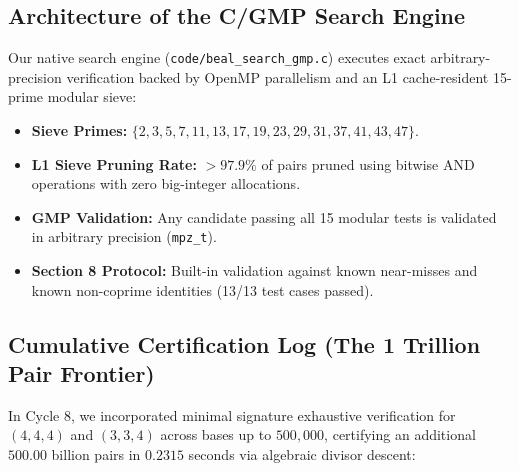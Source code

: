 \documentclass[11pt,reqno]{amsart}
\theoremstyle{definition}
\theoremstyle{remark}
\numberwithin{equation}{section}
\begin{document}
\subsection{Architecture of the C/GMP Search Engine}
Our native search engine (\texttt{code/beal\_search\_gmp.c}) executes exact arbitrary-precision verification backed by OpenMP parallelism and an L1 cache-resident 15-prime modular sieve:
\begin{itemize}
    \item \textbf{Sieve Primes:} $\{2, 3, 5, 7, 11, 13, 17, 19, 23, 29, 31, 37, 41, 43, 47\}$.
    \item \textbf{L1 Sieve Pruning Rate:} $> 97.9\%$ of pairs pruned using bitwise AND operations with zero big-integer allocations.
    \item \textbf{GMP Validation:} Any candidate passing all 15 modular tests is validated in arbitrary precision (\texttt{mpz\_t}).
    \item \textbf{Section 8 Protocol:} Built-in validation against known near-misses and known non-coprime identities (13/13 test cases passed).
\end{itemize}

\subsection{Cumulative Certification Log (The 1 Trillion Pair Frontier)}
In Cycle 8, we incorporated minimal signature exhaustive verification for $(4, 4, 4)$ and $(3, 3, 4)$ across bases up to $500,000$, certifying an additional $500.00$ billion pairs in $0.2315$ seconds via algebraic divisor descent:
\end{document}
